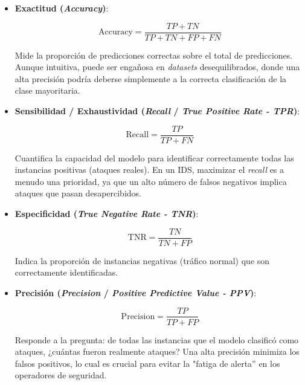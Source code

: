 \begin{itemize}

    \item\textbf{Exactitud (\textit{Accuracy})}: 
    
        \begin{equation}
        \mathrm{Accuracy} = \frac{TP + TN}{TP + TN + FP + FN}
        \label{eq:accuracy}
        \end{equation}
    
     Mide la proporción de predicciones correctas sobre el total de predicciones. Aunque intuitiva, puede ser engañosa en \textit{datasets} desequilibrados, donde una alta precisión podría deberse simplemente a la correcta clasificación de la clase mayoritaria.
    
    \item\textbf{Sensibilidad / Exhaustividad (\textit{Recall} / \textit{True Positive Rate - TPR})}: 

          \begin{equation}
            \mathrm{Recall} = \frac{TP}{TP + FN}
            \label{eq:recall}
          \end{equation}
    

     Cuantifica la capacidad del modelo para identificar correctamente todas las instancias positivas (ataques reales). En un IDS, maximizar el \textit{recall} es a menudo una prioridad, ya que un alto número de falsos negativos implica ataques que pasan desapercibidos.
    
    \item\textbf{Especificidad (\textit{True Negative Rate - TNR})}:
    
      \begin{equation}
        \mathrm{TNR} = \frac{TN}{TN + FP}
        \label{eq:tnr}
      \end{equation}
        
     Indica la proporción de instancias negativas (tráfico normal) que son correctamente identificadas.
    
    \item\textbf{Precisión (\textit{Precision} / \textit{Positive Predictive Value - PPV})}: 

      \begin{equation}
        \mathrm{Precision} = \frac{TP}{TP + FP}
        \label{eq:precision}
      \end{equation}

     Responde a la pregunta: de todas las instancias que el modelo clasificó como ataques, ¿cuántas fueron realmente ataques? Una alta precisión minimiza los falsos positivos, lo cual es crucial para evitar la "fatiga de alerta'' en los operadores de seguridad.
    

\end{itemize}
